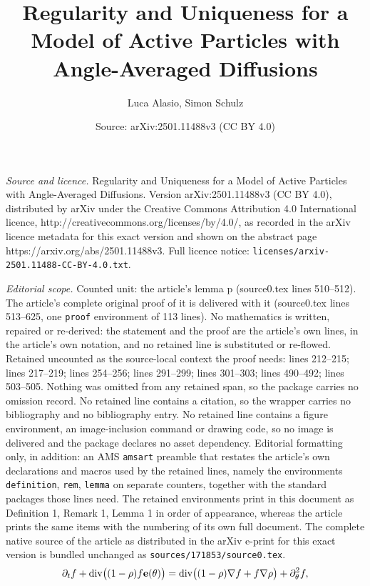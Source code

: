 \documentclass[10pt,a4paper]{amsart}
\title{Regularity and Uniqueness for a Model of Active Particles with Angle-Averaged Diffusions}
\author{Luca Alasio, Simon Schulz}
\date{Source: arXiv:2501.11488v3 (CC BY 4.0)}
\DeclareMathOperator{\dv}{div}
\newcommand{\e}{{\bf e}}
\begin{document}
\maketitle

\noindent\emph{Source and licence.} Regularity and Uniqueness for a Model of Active Particles with Angle-Averaged Diffusions. Version arXiv:2501.11488v3 (CC BY 4.0), distributed by arXiv under the Creative Commons Attribution 4.0 International licence, http://creativecommons.org/licenses/by/4.0/, as recorded in the arXiv licence metadata for this exact version and shown on the abstract page https://arxiv.org/abs/2501.11488v3. Full licence notice: \texttt{licenses/arxiv-2501.11488-CC-BY-4.0.txt}.\par\smallskip

\noindent\textit{Editorial scope.} Counted unit: the article's lemma p (source0.tex lines 510--512). The article's complete original proof of it is delivered with it (source0.tex lines 513--625, one \texttt{proof} environment of 113 lines). No mathematics is written, repaired or re-derived: the statement and the proof are the article's own lines, in the article's own notation, and no retained line is substituted or re-flowed.  Retained uncounted as the source-local context the proof needs: lines 212--215; lines 217--219; lines 254--256; lines 291--299; lines 301--303; lines 490--492; lines 503--505.  Nothing was omitted from any retained span, so the package carries no omission record.  No retained line contains a citation, so the wrapper carries no bibliography and no bibliography entry.  No retained line contains a figure environment, an image-inclusion command or drawing code, so no image is delivered and the package declares no asset dependency.  Editorial formatting only, in addition: an AMS \texttt{amsart} preamble that restates the article's own declarations and macros used by the retained lines, namely the environments \texttt{definition}, \texttt{rem}, \texttt{lemma} on separate counters, together with the standard packages those lines need.  The retained environments print in this document as Definition 1, Remark 1, Lemma 1 in order of appearance, whereas the article prints the same items with the numbering of its own full document.  The complete native source of the article as distributed in the arXiv e-print for this exact version is bundled unchanged as \texttt{sources/171853/source0.tex}.
\begin{equation}\label{eq:main eqn}
    \partial_t f +   \dv \!\big(  (1- \rho) f \e(\theta)\big)
= \dv \!\big( (1-\rho)\nabla f + f \nabla \rho \big) + \partial_{\theta}^2 f, 
\end{equation}
\end{document}
